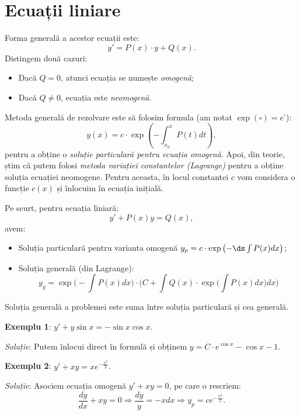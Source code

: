 
\section{Ecuații liniare}
\label{sec:lin}

Forma generală a acestor ecuații este:
\[
  y' = P(x) \cdot y + Q(x).
\]
Distingem două cazuri:
\begin{itemize}
\item Dacă $Q = 0$, atunci ecuația se numește \emph{omogenă};
\item Dacă $Q \neq 0$, ecuația este \emph{neomogenă}.
\end{itemize}

Metoda generală de rezolvare este să folosim formula (am notat $ \exp(\square) = e^\square $):
\[
    y(x) = c \cdot \exp \left( -\int_{x_0}^x P(t) dt \right),
\]
pentru a obține o \emph{soluție particulară pentru ecuația omogenă}. Apoi, din teorie,
știm că putem folosi \emph{metoda variației constantelor (Lagrange)} pentru a obține
soluția ecuației neomogene. Pentru aceasta, în locul constantei $c$ vom considera
o funcție $c(x)$ și înlocuim în ecuația inițială.

Pe scurt, pentru ecuația liniară:
\[
  y' + P(x) y = Q(x),
\]
avem:
\begin{itemize}
  \item Soluția particulară pentru varianta omogenă $y_p = c \cdot \exp\left( -\ds\int P(x) dx \right)$;
  \item Soluția generală (din Lagrange):
    \[
      y_g = \exp\Big(-\int P(x) dx\Big) \cdot \Big( C + \int Q(x) \cdot \exp\Big( \int P(x) dx \Big) dx \Big)
    \]
\end{itemize}

Soluția generală a problemei este suma între soluția particulară și cea generală.


\textbf{Exemplu 1}: $y' + y \sin x = -\sin x \cos x$.

\emph{Soluție}: Putem înlocui direct în formulă și obținem $y = C \cdot e^{\cos x} - \cos x - 1$.

\vspace{0.5cm}

\textbf{Exemplu 2}: $y' + xy = x e^{-\frac{x^2}{2}}$.

\emph{Soluție}: Asociem ecuația omogenă $y' + xy = 0$, pe care o rescriem:
\[
  \frac{dy}{dx} + xy = 0 \Rightarrow \frac{dy}{y} = -xdx \Rightarrow y_p = ce^{-\frac{x^2}{2}}.
\]

